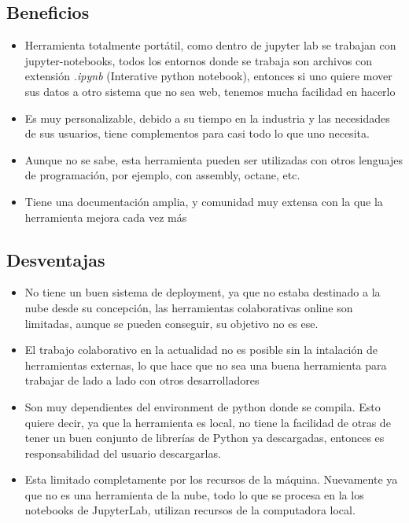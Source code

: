 \documentclass[a4paper,12pt]{article}
\begin{document}
\subsection{Beneficios}
\begin{itemize}
    \item Herramienta totalmente portátil, como dentro de jupyter lab se
        trabajan con jupyter-notebooks, todos los entornos donde se trabaja
        son archivos con extensión \textit{.ipynb} (Interative python notebook),
        entonces si uno quiere mover sus datos a otro sistema que no sea web,
        tenemos mucha facilidad en hacerlo\cite{jupyter_blog_2021}
    \item Es muy personalizable, debido a su tiempo en la industria y las
        necesidades de sus usuarios, tiene complementos para casi todo lo que
        uno necesita.\cite{medium_comparison_2024}
    \item Aunque no se sabe, esta herramienta pueden ser utilizadas con otros
        lenguajes de programación, por ejemplo, con assembly, octane, etc.
    \item Tiene una documentación amplia, y comunidad muy extensa con la que la
        herramienta mejora cada vez más
\end{itemize}
\subsection{Desventajas}
\begin{itemize}
    \item No tiene un buen sistema de deployment, ya que no estaba destinado a
        la nube desde su concepción, las herramientas colaborativas online son
        limitadas, aunque se pueden conseguir, su objetivo no es ese.
    \item El trabajo colaborativo en la actualidad no es posible sin la
        intalación de herramientas externas, lo que hace que no sea una buena
        herramienta para trabajar de lado a lado con otros desarrolladores
    \item Son muy dependientes del environment de python donde se compila. Esto
        quiere decir, ya que la herramienta es local, no tiene la facilidad de
        otras de tener un buen conjunto de librerías de Python ya descargadas,
        entonces es responsabilidad del usuario descargarlas.
    \item Esta limitado completamente por los recursos de la máquina. Nuevamente
        ya que no es una herramienta de la nube, todo lo que se procesa en la
        los notebooks de JupyterLab, utilizan recursos de la computadora local.
\end{itemize}
\end{document}
